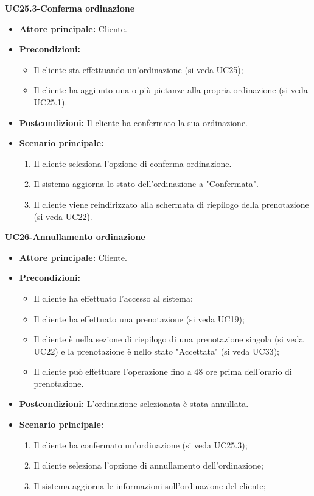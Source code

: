 \textbf{UC25.3-Conferma ordinazione}
\begin{itemize}
\item \textbf{Attore principale:} Cliente.
\item \textbf{Precondizioni:} 
    \begin{itemize}
        \item Il cliente sta effettuando un'ordinazione (si veda UC25);
        \item Il cliente ha aggiunto una o più pietanze alla propria ordinazione (si veda UC25.1).
    \end{itemize}
\item \textbf{Postcondizioni:} Il cliente ha confermato la sua ordinazione.
\item \textbf{Scenario principale:}
    \begin{enumerate}
        \item Il cliente seleziona l'opzione di conferma ordinazione.
        \item Il sistema aggiorna lo stato dell'ordinazione a "Confermata".
        \item Il cliente viene reindirizzato alla schermata di riepilogo della prenotazione (si veda UC22).
    \end{enumerate}
\end{itemize}


\textbf{UC26-Annullamento ordinazione}
\begin{itemize}
\item \textbf{Attore principale:} Cliente.
\item \textbf{Precondizioni:} 
\begin{itemize}
    \item Il cliente ha effettuato l'accesso al sistema;
    \item Il cliente ha effettuato una prenotazione (si veda UC19);
    \item Il cliente è nella sezione di riepilogo di una prenotazione singola (si veda UC22) e la prenotazione è nello stato "Accettata" (si veda UC33);
    \item Il cliente può effettuare l'operazione fino a 48 ore prima dell'orario di prenotazione.
\end{itemize}
\item \textbf{Postcondizioni:} L'ordinazione selezionata è stata annullata.
\item \textbf{Scenario principale:}
\begin{enumerate}
    \item Il cliente ha confermato un'ordinazione (si veda UC25.3);
    \item Il cliente seleziona l'opzione di annullamento dell'ordinazione;
    \item Il sistema aggiorna le informazioni sull'ordinazione del cliente;
\end{enumerate}
\end{itemize}
